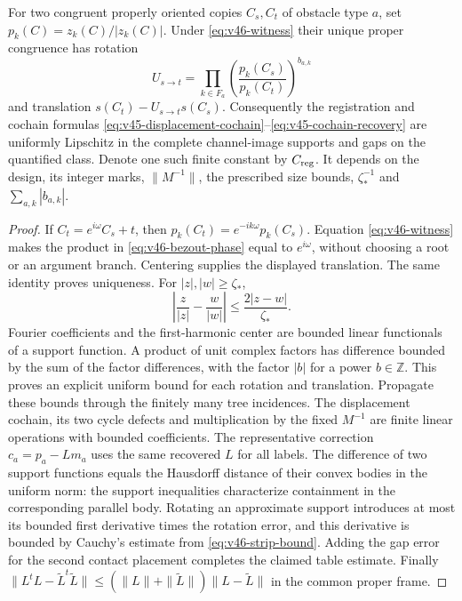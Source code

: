 \begin{lemma}
\label{lem:v46-registration}
For two congruent properly oriented copies $C_s,C_t$ of obstacle type $a$,
set $p_k(C)=z_k(C)/|z_k(C)|$.  Under \eqref{eq:v46-witness} their unique
proper congruence has rotation
\begin{equation}\label{eq:v46-bezout-phase}
 U_{s\to t}=\prod_{k\in F_a}
          \left(\frac{p_k(C_s)}{p_k(C_t)}\right)^{b_{a,k}}
\end{equation}
and translation $s(C_t)-U_{s\to t}s(C_s)$.
Consequently the registration and cochain formulas
\eqref{eq:v45-displacement-cochain}--\eqref{eq:v45-cochain-recovery}
are uniformly Lipschitz in the complete channel-image supports and gaps
on the quantified class.  Denote one such finite constant by $C_{\rm reg}$.
It depends on the design, its integer marks, $\|M^{-1}\|$, the prescribed
size bounds, $\zeta_*^{-1}$ and $\sum_{a,k}|b_{a,k}|$.
\end{lemma}

\begin{proof}
If $C_t=e^{i\omega}C_s+t$, then
$p_k(C_t)=e^{-ik\omega}p_k(C_s)$.  Equation
\eqref{eq:v46-witness} makes the product in
\eqref{eq:v46-bezout-phase} equal to $e^{i\omega}$, without choosing a
root or an argument branch.  Centering supplies the displayed translation.
The same identity proves uniqueness.
For $|z|,|w|\ge\zeta_*$,
\[
 \left|\frac z{|z|}-\frac w{|w|}\right|
 \le\frac{2|z-w|}{\zeta_*}.
\]
Fourier coefficients and the first-harmonic center are bounded linear
functionals of a support function.  A product of unit complex factors has
difference bounded by the sum of the factor differences, with the factor
$|b|$ for a power $b\in\mathbb Z$.  This proves an explicit uniform
bound for each rotation and translation.  Propagate these bounds through
the finitely many tree incidences.  The displacement cochain, its two
cycle defects and multiplication by the fixed $M^{-1}$ are finite linear
operations with bounded coefficients.  The representative correction
$c_a=p_a-Lm_a$ uses the same recovered $L$ for all labels.
The difference of two support functions equals the Hausdorff distance
of their convex bodies in the uniform norm: the support inequalities
characterize containment in the corresponding parallel body.  Rotating
an approximate support introduces at most its bounded first derivative
times the rotation error, and this derivative is bounded by Cauchy's
estimate from \eqref{eq:v46-strip-bound}.  Adding the gap error for the
second contact placement completes the claimed table estimate.
Finally
$\|L^tL-\widetilde L^t\widetilde L\|
 \le(\|L\|+\|\widetilde L\|)\|L-\widetilde L\|$
in the common proper frame.
\end{proof}

